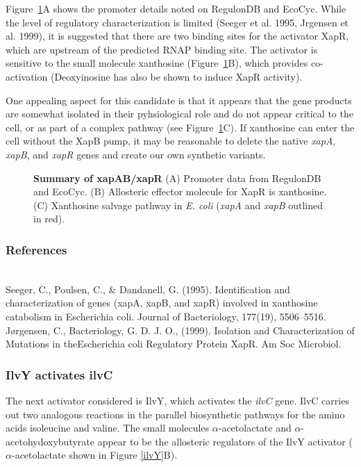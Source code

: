 \documentclass[12pt]{article}
\begin{document}
Figure~\ref{xapR}A shows the promoter details noted on RegulonDB and EcoCyc.
While the level of regulatory characterization is limited (Seeger et al. 1995, Jrgensen et
al. 1999), it is suggested that there are two binding sites for the activator
XapR, which are upstream of the predicted RNAP binding site. The activator is sensitive to
the small molecule xanthosine (Figure~\ref{xapR}B), which provides co-activation
 (Deoxyinosine has also be shown to induce XapR activity).

One appealing aspect for this candidate is that it appears that the gene products
are somewhat isolated in their pyhsiological role and do not appear critical to
the cell, or as part of a complex pathway (see Figure~\ref{xapR}C). If xanthosine can
enter the cell without the XapB pump, it may be reasonable to delete the native
\textit{xapA}, \textit{xapB}, and \textit{xapR} genes and create our own
synthetic variants.

\begin{figure}[ht!]
 \centering
 \caption{
       \textbf{Summary of xapAB/xapR} (A) Promoter data from RegulonDB and EcoCyc. (B) Allosteric
       effector molecule for XapR is xanthosine. (C) Xanthosine salvage pathway in \textit{E. coli} (\textit{xapA} and \textit{xapB}
       outlined in red).}
 \label{xapR}
\end{figure}

\subsubsection*{References} \\

\noindent Seeger, C., Poulsen, C., & Dandanell, G. (1995). Identification and
characterization of genes (xapA, xapB, and xapR) involved in xanthosine
catabolism in Escherichia coli. Journal of Bacteriology, 177(19), 5506–5516.\\

\noindent Jørgensen, C., Bacteriology, G. D. J. O., (1999). Isolation and
Characterization of Mutations in theEscherichia coli Regulatory Protein XapR. Am
Soc Microbiol.

\subsubsection*{ IlvY activates ilvC}

The next activator considered is IlvY, which activates the \textit{ilvC} gene. IlvC
carries out two analogous reactions in the parallel biosynthetic pathways for
the amino acids isoleucine and valine.  The small molecules
$\alpha$-acetolactate and $\alpha$-acetohydoxybutyrate appear to be the
allosteric regulators of the IlvY activator ($\alpha$-acetolactate shown in Figure \ref{ilvY}B).
\end{document}

